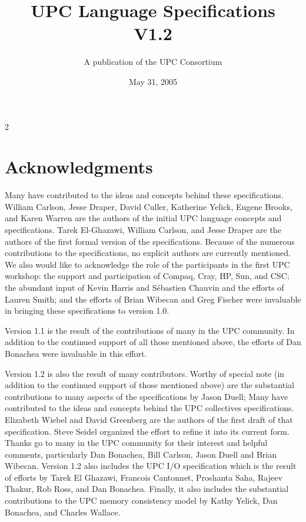 \documentclass[12pt,titlepage]{article}
\title{UPC Language Specifications\\
V1.2 }
\author{A publication of the UPC Consortium}
\date {May 31, 2005}
\newcounter{parnum}
\newcommand\np{\addtocounter{parnum}{1}\hspace{-2em}\makebox[2em][l]{\arabic{parnum}}}
\newcommand\npf{\setcounter{parnum}{0}\np}
\begin{document}
\maketitle

\setcounter{page}2
\section*{Acknowledgments}
                                             
\npf Many have contributed to the ideas and concepts behind
    these specifications.  William Carlson, Jesse Draper,  David Culler, 
Katherine Yelick,
Eugene Brooks, and Karen Warren are the authors of the initial
UPC language concepts and specifications. Tarek El-Ghazawi, 
William Carlson, and Jesse Draper are the authors of the first formal
version of the specifications.  Because of the numerous contributions
to the specifications, no explicit authors are currently mentioned.
We also would like to
acknowledge the role of the participants in the first UPC workshop:
the support and participation of Compaq, Cray, HP, Sun,
and CSC; the abundant input of
Kevin Harris and S\'{e}bastien Chauvin and the efforts of Lauren
Smith; and the efforts of Brian Wibecan and Greg Fischer were
invaluable in bringing these specifications to version 1.0.

\np Version 1.1 is the result of the contributions of many in the UPC
community.  In addition to the
continued support of all those mentioned above, the efforts of Dan
Bonachea were invaluable in this effort.

\np Version 1.2 is also the result of many contributors.  Worthy of special
note (in addition to the
continued support of those mentioned above) are the substantial 
contributions to many aspects of the specifications by Jason Duell;
Many have contributed to the ideas and concepts behind the
UPC collectives specifications.
Elizabeth Wiebel and David Greenberg are the authors of the first draft of
that specification.  Steve Seidel organized the effort to
refine it into its current form.
Thanks go to many in the UPC community for their interest and helpful
comments, particularly Dan Bonachea, Bill Carlson, Jason Duell and
Brian Wibecan.
Version 1.2 also includes the UPC I/O specification which is the result of
efforts by Tarek El Ghazawi, Francois Cantonnet, Proshanta Saha, Rajeev Thakur,
Rob Ross, and Dan Bonachea.
Finally, it also includes the substantial contributions to the UPC memory consistency
model by Kathy Yelick, Dan Bonachea, and Charles Wallace.
\end{document}
